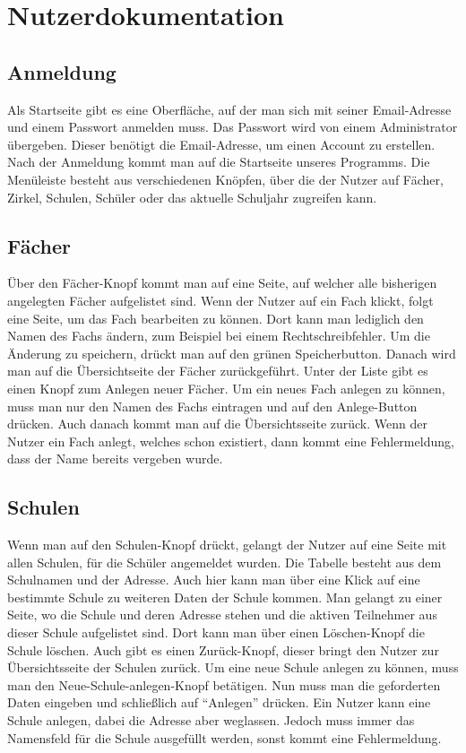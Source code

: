\section{Nutzerdokumentation}
\subsection{Anmeldung}
Als Startseite gibt es eine Oberfläche, auf der man sich mit seiner Email-Adresse und einem Passwort anmelden muss. Das Passwort wird von einem Administrator übergeben. Dieser benötigt die Email-Adresse, um einen Account zu erstellen. Nach der Anmeldung kommt man auf die Startseite unseres Programms. Die Menüleiste besteht aus verschiedenen Knöpfen, über die der Nutzer auf Fächer, Zirkel, Schulen, Schüler oder das aktuelle Schuljahr zugreifen kann.

\subsection{Fächer}
Über den Fächer-Knopf kommt man auf eine Seite, auf welcher alle bisherigen angelegten Fächer aufgelistet sind. Wenn der Nutzer auf ein Fach klickt, folgt eine Seite, um das Fach bearbeiten zu können. Dort kann man lediglich den Namen des Fachs ändern, zum Beispiel bei einem Rechtschreibfehler. Um die Änderung zu speichern, drückt man auf den grünen Speicherbutton. Danach wird man auf die Übersichtseite der Fächer zurückgeführt. Unter der Liste gibt es einen Knopf zum Anlegen neuer Fächer. Um ein neues Fach anlegen zu können, muss man nur den Namen des Fachs eintragen und auf den Anlege-Button drücken. Auch danach kommt man auf die Übersichtsseite zurück. Wenn der Nutzer ein Fach anlegt, welches schon existiert, dann kommt eine Fehlermeldung, dass der Name bereits vergeben wurde.

\subsection{Schulen}
Wenn man auf den Schulen-Knopf drückt, gelangt der Nutzer auf eine Seite mit allen Schulen, für die Schüler angemeldet wurden. Die Tabelle besteht aus dem Schulnamen und der Adresse. Auch hier kann man über eine Klick auf eine bestimmte Schule zu weiteren Daten der Schule kommen. Man gelangt zu einer Seite, wo die Schule und deren Adresse stehen und die aktiven Teilnehmer aus dieser Schule aufgelistet sind. Dort kann man über einen Löschen-Knopf die Schule löschen. Auch gibt es einen Zurück-Knopf, dieser bringt den Nutzer zur Übersichtsseite der Schulen zurück. Um eine neue Schule anlegen zu können, muss man den Neue-Schule-anlegen-Knopf betätigen. Nun muss man die geforderten Daten eingeben und schließlich auf "`Anlegen"' drücken. Ein Nutzer kann eine Schule anlegen, dabei die Adresse aber weglassen. Jedoch muss immer das Namensfeld für die Schule ausgefüllt werden, sonst kommt eine Fehlermeldung.

